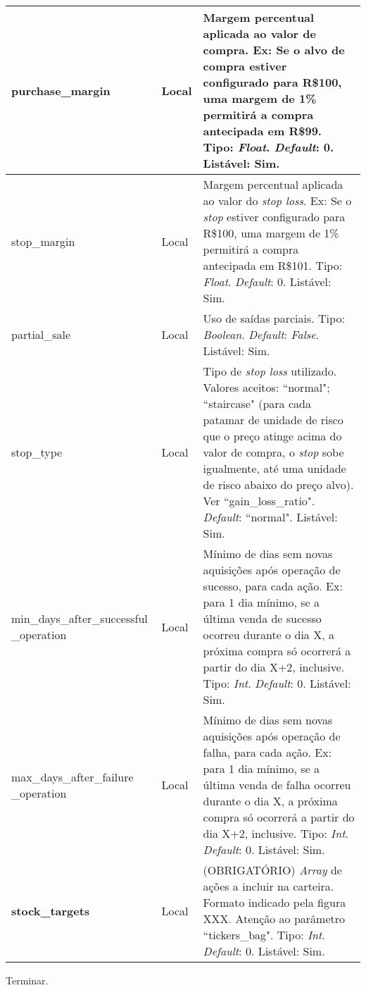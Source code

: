 \begin{center}
{\begin{longtable}[m]{| m{11em} | m{3em}| m{21em} |}
        purchase\_margin & Local & Margem percentual aplicada ao valor de compra. Ex: Se o alvo de compra estiver configurado para R\$100, uma margem de 1\% permitirá a compra antecipada em R\$99. Tipo: \textit{Float}. \textit{Default}: 0. Listável: Sim. \\
        \hline
        stop\_margin & Local & Margem percentual aplicada ao valor do \textit{stop loss}. Ex: Se o \textit{stop} estiver configurado para R\$100, uma margem de 1\% permitirá a compra antecipada em R\$101. Tipo: \textit{Float}. \textit{Default}: 0. Listável: Sim. \\
        \hline
        partial\_sale & Local & Uso de saídas parciais. Tipo: \textit{Boolean}. \textit{Default}: \textit{False}. Listável: Sim. \\
        \hline
        stop\_type & Local & Tipo de \textit{stop loss} utilizado. Valores aceitos: ``normal"; ``staircase" (para cada patamar de unidade de risco que o preço atinge acima do valor de compra, o \textit{stop} sobe igualmente, até uma unidade de risco abaixo do preço alvo). Ver ``gain\_loss\_ratio". \textit{Default}: ``normal". Listável: Sim. \\
        \hline
        min\_days\_after\_successful \_operation & Local & Mínimo de dias sem novas aquisições após operação de sucesso, para cada ação. Ex: para 1 dia mínimo, se a última venda de sucesso ocorreu durante o dia X, a próxima compra só ocorrerá a partir do dia X+2, inclusive. Tipo: \textit{Int}. \textit{Default}: 0. Listável: Sim. \\
        \hline
        max\_days\_after\_failure \_operation & Local & Mínimo de dias sem novas aquisições após operação de falha, para cada ação. Ex: para 1 dia mínimo, se a última venda de falha ocorreu durante o dia X, a próxima compra só ocorrerá a partir do dia X+2, inclusive. Tipo: \textit{Int}. \textit{Default}: 0. Listável: Sim. \\
        \hline

        \textbf{stock\_targets} & Local & (OBRIGATÓRIO) \textit{Array} de ações a incluir na carteira. Formato indicado pela figura XXX. Atenção ao parâmetro ``tickers\_bag". Tipo: \textit{Int}. \textit{Default}: 0. Listável: Sim. \\
        \hline

    \end{longtable}}
\end{center}

Terminar.




